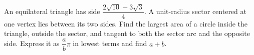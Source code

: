 An equilateral triangle has side $\dfrac{2\sqrt{10}+3\sqrt3}{4}$. A unit-radius sector centered at one vertex lies between its two sides. Find the largest area of a circle inside the triangle, outside the sector, and tangent to both the sector arc and the opposite side. Express it as $\dfrac{a}{b}\pi$ in lowest terms and find $a+b$.
